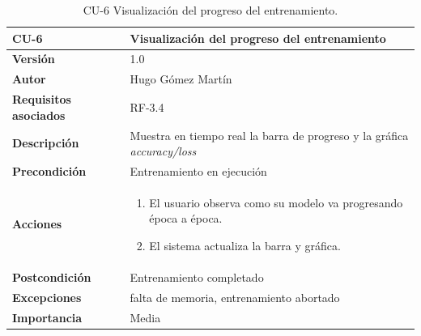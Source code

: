 \begin{table}[p]
	\centering
	\begin{tabularx}{\linewidth}{ p{} p{} }
		\toprule
		\textbf{CU-6}    & \textbf{Visualización del progreso del entrenamiento}\\
		\toprule
		\textbf{Versión}              & 1.0    \\
		\textbf{Autor}                & Hugo Gómez Martín \\
		\textbf{Requisitos asociados} & RF-3.4 \\
		\textbf{Descripción}          & Muestra en tiempo real la barra de progreso y la gráfica \textit{accuracy/loss} \\
		\textbf{Precondición}         & Entrenamiento en ejecución \\
		\textbf{Acciones}             &
		\begin{enumerate}
			\def\labelenumi{\arabic{enumi}.}
			\tightlist
			\item El usuario observa como su modelo va progresando época a época.
			\item El sistema actualiza la barra y gráfica.
		\end{enumerate}\\
		\textbf{Postcondición}        & Entrenamiento completado \\
		\textbf{Excepciones}          & falta de memoria, entrenamiento abortado \\
		\textbf{Importancia}          & Media \\
		\bottomrule
	\end{tabularx}
	\caption{CU-6 Visualización del progreso del entrenamiento.}
\end{table}


